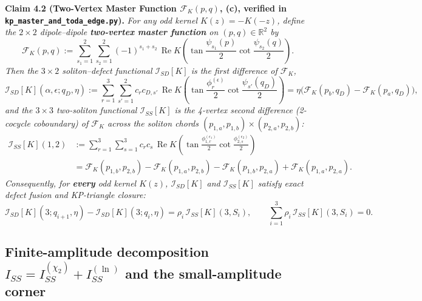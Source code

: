 \documentclass[11pt,a4paper]{article}
\newcommand{\Rea}{\operatorname{Re}}
\begin{document}
\medskip\noindent
\textbf{Claim 4.2 (Two-Vertex Master Function $\mathcal{F}_K(p,q)$, \textbf{(c)}, verified in \texttt{kp\_master\_and\_toda\_edge.py}).}
\emph{For any odd kernel $K(z) = -K(-z)$, define the $2\times 2$ dipole--dipole
\textbf{two-vertex master function} on $(p,q) \in \mathbb{R}^2$ by}
\begin{equation}
  \mathcal{F}_K(p,q)
  := \sum_{s_1=1}^2 \sum_{s_2=1}^2 (-1)^{s_1+s_2}\,
     \Rea K\!\left(\tan\frac{\psi_{s_1}(p)}{2}\cot\frac{\psi_{s_2}(q)}{2}\right).
  \label{eq:F_master}
\end{equation}
\emph{Then the $3\times 2$ soliton--defect functional $\mathcal{I}_{SD}[K]$ is the
first difference of $\mathcal{F}_K$,}
\begin{equation}
  \mathcal{I}_{SD}[K](\alpha,\epsilon;q_D,\eta)
  := \sum_{r=1}^3\sum_{s'=1}^2 c_r c_{D,s'}\,\Rea K\!\left(\tan\frac{\phi_r^{(\epsilon)}}{2}\cot\frac{\psi_{s'}(q_D)}{2}\right)
  = \eta\Big(\mathcal{F}_K(p_b,q_D) - \mathcal{F}_K(p_a,q_D)\Big),
  \label{eq:ISD_from_master}
\end{equation}
\emph{and the $3\times 3$ two-soliton functional $\mathcal{I}_{SS}[K]$ is the
4-vertex second difference (2-cocycle coboundary) of $\mathcal{F}_K$ across the
soliton chords $(p_{1,a},p_{1,b})\times(p_{2,a},p_{2,b})$:}
\begin{align}
  \mathcal{I}_{SS}[K](1,2)
  &:= \sum_{r=1}^3\sum_{s=1}^3 c_r c_s\,\Rea K\!\left(\tan\frac{\phi_{1,r}^{(\epsilon_1)}}{2}\cot\frac{\phi_{2,s}^{(\epsilon_2)}}{2}\right)
  \nonumber \\
  &= \mathcal{F}_K(p_{1,b},p_{2,b}) - \mathcal{F}_K(p_{1,a},p_{2,b})
     - \mathcal{F}_K(p_{1,b},p_{2,a}) + \mathcal{F}_K(p_{1,a},p_{2,a}).
  \label{eq:ISS_from_master}
\end{align}
\emph{Consequently, for \textbf{every} odd kernel $K(z)$, $\mathcal{I}_{SD}[K]$
and $\mathcal{I}_{SS}[K]$ satisfy exact defect fusion and KP-triangle closure:}
\begin{equation}
  \mathcal{I}_{SD}[K](3;q_{i+1},\eta) - \mathcal{I}_{SD}[K](3;q_i,\eta)
  = \rho_i\,\mathcal{I}_{SS}[K](3,S_i), \qquad
  \sum_{i=1}^3 \rho_i\,\mathcal{I}_{SS}[K](3,S_i) = 0.
  \label{eq:K_fusion}
\end{equation}

\subsection{Finite-amplitude decomposition $I_{SS} = I_{SS}^{(\chi_2)} + I_{SS}^{(\ln)}$ and the small-amplitude corner}
\end{document}
